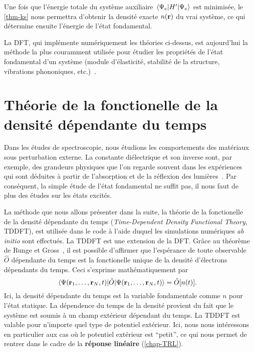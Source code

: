 Une fois que l'énergie totale du système auxiliaire $\ev{H'}{\Psi_e}$ est minimisée,
le \cref{thm-ks} nous permettra d'obtenir la densité exacte $n(\vb{r})$ du vrai système,
ce qui détermine ensuite l'énergie de l'état fondamental.

La DFT, qui implémente numériquement les théories ci-dessus,
est aujourd'hui la méthode la plus couramment utilisée pour étudier
les propriétés de l'état fondamental d'un système
(module d'élasticité, stabilité de la structure, vibrations phononiques, etc.)~\cite{Martin2004}.

\section[TDDFT]{Théorie de la fonctionelle de la densité dépendante du temps}
\label{sec-TDDFT}
Dans les études de spectroscopie,
nous étudions les comportements des matériaux sous perturbation externe.
La constante diélectrique et son inverse sont, par exemple,
des grandeurs physiques que l'on regarde souvent dans les expériences
qui sont déduites à partir de l'absorption et de la réflexion des lumières~\cite{Sottile2003}.
Par conséquent, la simple étude de l'état fondamental ne suffit pas,
il nous faut de plus des études sur les états excités.

La méthode que nous allons présenter dans la suite,
la théorie de la fonctionelle de la densité dépendante du temps
(\textit{Time-Dependent Density Functional Theory}, TDDFT),
est utilisée dans le code à l'aide duquel les simulations numériques \textit{ab initio} sont effectués.
La TDDFT est une extension de la DFT\@.
Grâce au théorème de Runge et Gross~\cite{Runge1984},
il est possible d'affirmer que l'espérance de toute observable $\hat{O}$ dépendante du temps
est la fonctionelle unique de la densité d'électrons dépendants du temps.
Ceci s'exprime mathématiquement par
\begin{equation}
  \ev{\hat{O}}{\Psi(\vb{r}_1, \ldots, \vb{r}_N, t)} = \hat{O}[n(t)].
\end{equation}
Ici, la densité dépendante du temps est la variable fondamentale comme $n$ pour l'état statique.
La dépendence du temps de la densité provient du fait que le système est soumis à un champ extérieur dépendant du temps.
La TDDFT est valable pour n'importe quel type de potentiel extérieur.
Ici, nous nous intéressons en particulier aux cas où le potentiel extérieur est ``petit'',
ce qui nous permet de rentrer dans le cadre de la \textbf{réponse linéaire} (\cref{chap-TRL}).

